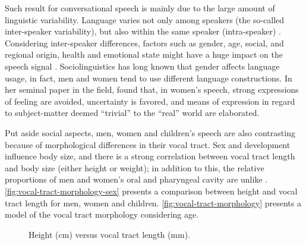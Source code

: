 Such result for conversational speech is mainly due to the large amount of linguistic variability. Language varies not only among speakers (the so-called inter-speaker variability), but also within the same speaker (intra-speaker) \citep{Benzeghiba2007}.  Considering inter-speaker differences, factors such as gender, age, social, and regional 
origin, health and emotional state might have a huge impact on the speech signal \citep{Benzeghiba2007}.
Sociolinguistics has long known that gender affects language usage, in fact, men and women tend to use different language constructions.
In her seminal paper in the field, \citet{Lakoff1973} \citep{Lakoff1973} found that, in women's speech, strong expressions 
of feeling are avoided, uncertainty is favored, and means of expression in regard to subject-matter deemed ``trivial'' to the 
``real'' world are elaborated. 

Put aside social aspects, men, women and children's speech are also contrasting because of morphological differences
in their vocal tract. Sex and development influence body size, and there is a strong correlation between vocal tract length and body size 
(either height or weight); in addition to this, the relative proportions of men and women's oral and pharyngeal cavity are unlike 
\cite{Fitch1999}. \autoref{fig:vocal-tract-morphology-sex} presents a comparison between height and
vocal tract length for men, women and children. \autoref{fig:vocal-tract-morphology} presents a model of the vocal tract morphology considering
age.

\begin{figure}[!ht]
        \noindent{}
        \caption{Height (cm) versus vocal tract length (mm).}
        \label{fig:vocal-tract-morphology-sex}
\end{figure}


